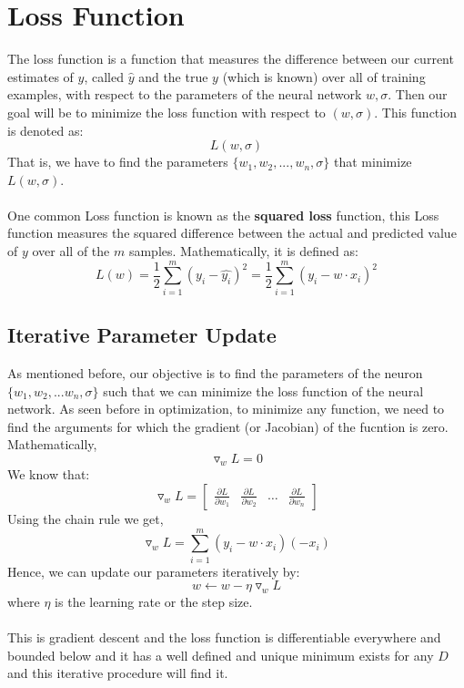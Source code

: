\documentclass[12pt, a4paper]{book}
\begin{document}
\section{Loss Function}
The loss function is a function that measures the difference between our current estimates of $y$, called $\hat{y}$ and the true $y$ (which is known) over all of training examples, with respect to the parameters of the neural network $w, \sigma$. Then our goal will be to minimize the loss function with respect to $(w, \sigma)$. This function is denoted as:
$$L(w, \sigma)$$
That is, we have to find the parameters $\{w_1,w_2,...,w_n, \sigma\}$ that minimize $L(w,\sigma)$.\\\\
One common Loss function is known as the \textbf{squared loss} function, this Loss function measures the squared difference between the actual and predicted value of $y$ over all of the $m$ samples. Mathematically, it is defined as:
$$L(w) = \frac{1}{2}\sum^m_{i=1}\left(y_i-\hat{y_i} \right)^2 = \frac{1}{2}\sum^m_{i=1}\left(y_i - w\cdot x_i \right)^2$$

\subsection{Iterative Parameter Update}
As mentioned before, our objective is to find the parameters of the neuron $\{w_1,w_2,...w_n,\sigma\}$ such that we can minimize the loss function of the neural network. As seen before in optimization, to minimize any function, we need to find the arguments for which the gradient (or Jacobian) of the fucntion is zero. Mathematically,
$$\triangledown_wL = 0$$
We know that:
$$\triangledown_wL = \begin{bmatrix}
    \frac{\partial L}{\partial w_1} & \frac{\partial L}{\partial w_2} & \ldots &
    \frac{\partial L}{\partial w_n}
\end{bmatrix}$$
Using the chain rule we get,
$$\triangledown_wL = \sum^m_{i=1}\left(y_i - w\cdot x_i \right)(-x_i)$$
Hence, we can update our parameters iteratively by:
$$w \gets w - \eta \triangledown_wL$$
where $\eta$ is the learning rate or the step size.\\\\
This is gradient descent and the loss function is differentiable everywhere and bounded below and it has a well defined and unique minimum exists for any $D$ and this iterative procedure will find it.
\end{document}
